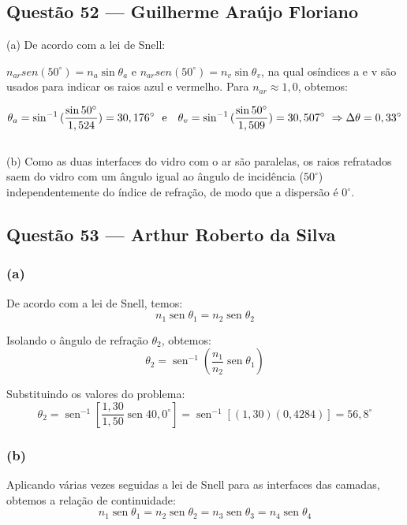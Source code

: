 \documentclass[12pt,a4paper]{article}
\begin{document}
\subsection{Questão 52 — Guilherme Araújo Floriano}

(a) De acordo com a lei de Snell:

$n_{ar}sen(50^{\circ}) = n_a\sin \theta_a$ e $n_{ar}sen(50^{\circ}) = n_v\sin\theta_v$, na qual osíndices a e v são usados para indicar os raios azul e vermelho. Para $n_{ar} \approx 1,0$, obtemos:

\[
\theta_a = \sin^{-1}{(\frac{\sin50^{\circ}}{1,524})} = 30,176^{\circ} \text{\space\space e \space\space}  
\theta_v = \sin^{-1}{(\frac{\sin50^{\circ}}{1,509})} = 30,507^{\circ} \
\Rightarrow \Delta\theta = 0,33^{\circ}
\]

\[
\]

(b) Como as duas interfaces do vidro com o ar são paralelas, os raios refratados saem do vidro com um ângulo igual ao ângulo de incidência ($50^{\circ}$) independentemente do índice de refração, de modo que a dispersão é $0^{\circ}$.

\subsection{Questão 53 — Arthur Roberto da Silva}
\subsubsection*{(a)}
De acordo com a lei de Snell, temos:
\begin{equation*}
n_1 \operatorname{sen} \theta_1 = n_2 \operatorname{sen} \theta_2
\end{equation*}

Isolando o ângulo de refração $\theta_2$, obtemos:
\begin{equation*}
\theta_2 = \operatorname{sen}^{-1}\left( \frac{n_1}{n_2} \operatorname{sen} \theta_1 \right)
\end{equation*}

Substituindo os valores do problema:
\begin{equation*}
\theta_2 = \operatorname{sen}^{-1}\left[ \frac{1,30}{1,50} \operatorname{sen} 40,0^\circ \right] = \operatorname{sen}^{-1}[ (1,30)(0,4284) ] = 56,8^\circ
\end{equation*}

\subsubsection*{(b)}
Aplicando várias vezes seguidas a lei de Snell para as interfaces das camadas, obtemos a relação de continuidade:
\begin{equation*}
n_1 \operatorname{sen} \theta_1 = n_2 \operatorname{sen} \theta_2 = n_3 \operatorname{sen} \theta_3 = n_4 \operatorname{sen} \theta_4
\end{equation*}
\end{document}
